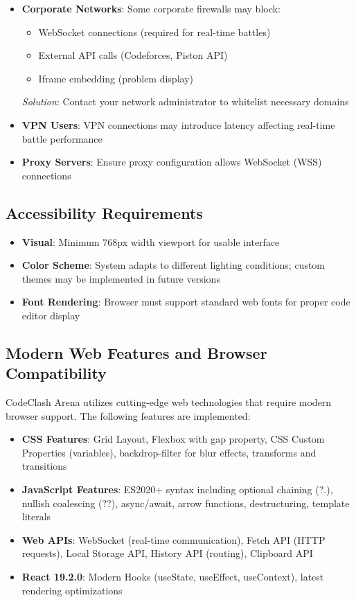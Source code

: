 \documentclass[12pt,a4paper]{article}
\begin{document}
\begin{itemize}[leftmargin=*]
\item \textbf{Corporate Networks}: Some corporate firewalls may block:
  \begin{itemize}
    \item WebSocket connections (required for real-time battles)
    \item External API calls (Codeforces, Piston API)
    \item Iframe embedding (problem display)
  \end{itemize}
  \textit{Solution}: Contact your network administrator to whitelist necessary domains
\item \textbf{VPN Users}: VPN connections may introduce latency affecting real-time battle performance
\item \textbf{Proxy Servers}: Ensure proxy configuration allows WebSocket (WSS) connections
\end{itemize}

\subsection{Accessibility Requirements}

\begin{itemize}[leftmargin=*]
\item \textbf{Visual}: Minimum 768px width viewport for usable interface
\item \textbf{Color Scheme}: System adapts to different lighting conditions; custom themes may be implemented in future versions
\item \textbf{Font Rendering}: Browser must support standard web fonts for proper code editor display
\end{itemize}

\subsection{Modern Web Features and Browser Compatibility}

CodeClash Arena utilizes cutting-edge web technologies that require modern browser support. The following features are implemented:

\begin{itemize}[leftmargin=*]
\item \textbf{CSS Features}: Grid Layout, Flexbox with gap property, CSS Custom Properties (variables), backdrop-filter for blur effects, transforms and transitions
\item \textbf{JavaScript Features}: ES2020+ syntax including optional chaining (?.), nullish coalescing (??), async/await, arrow functions, destructuring, template literals
\item \textbf{Web APIs}: WebSocket (real-time communication), Fetch API (HTTP requests), Local Storage API, History API (routing), Clipboard API
\item \textbf{React 19.2.0}: Modern Hooks (useState, useEffect, useContext), latest rendering optimizations
\end{itemize}
\end{document}
